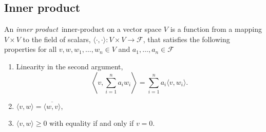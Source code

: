 \subsection{Inner product}


\begin{definition} \label{def:inner_product}
An \emph{inner product}~\gls{inner-product} on a vector space $V$ is a function from a mapping $V\times V$ to the field of scalars, $\langle \cdot, \cdot \rangle : V \times V \rightarrow \mathcal{F}$,  that satisfies the following properties for all $v, w, w_1, \ldots, w_n \in V$ and $a_1, \ldots, a_n \in \mathcal{F}$

\begin{enumerate}
  \item Linearity in the second argument,$$ \left\langle v, \sum_{i=1}^n a_i w_i\right\rangle = \sum_{i=1}^n a_i \langle v, w_i\rangle. $$
  \item $\langle v,w \rangle = \overline{\langle w,v \rangle} $, 
  \item  $\langle v,w \rangle \geq 0 $ with equality if and only if $v = 0$.
\end{enumerate}
\end{definition}


